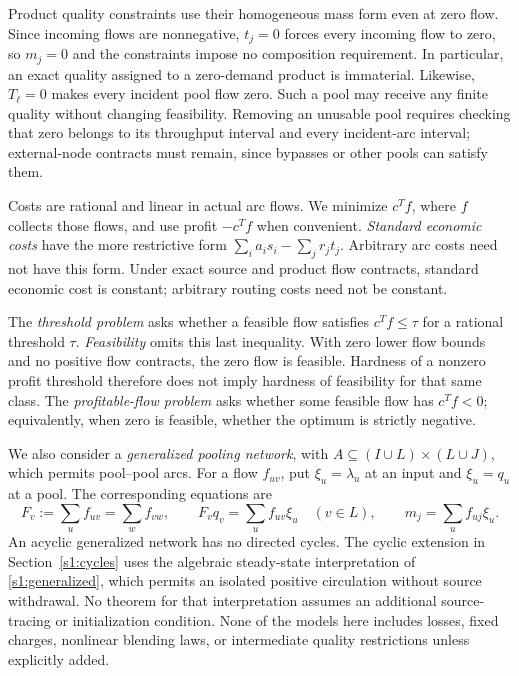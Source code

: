Product quality constraints use their homogeneous mass form even at
zero flow. Since incoming flows are nonnegative, $t_j=0$ forces every
incoming flow to zero, so $m_j=0$ and the constraints impose no composition
requirement. In particular, an exact quality assigned to a zero-demand
product is immaterial. Likewise, $T_\ell=0$ makes every incident pool
flow zero. Such a pool may receive any finite quality without changing
feasibility. Removing an unusable pool requires checking that zero belongs
to its throughput interval and every incident-arc interval; external-node
contracts must remain, since bypasses or other pools can satisfy them.

Costs are rational and linear in actual arc flows. We minimize $c^Tf$,
where $f$ collects those flows, and use profit $-c^Tf$ when convenient.
\emph{Standard economic costs} have the more restrictive form
$\sum_i a_i s_i-\sum_j r_jt_j$. Arbitrary arc costs need not have this
form. Under exact source and product flow contracts, standard economic
cost is constant; arbitrary routing costs need not be constant.

The \emph{threshold problem} asks whether a feasible flow satisfies
$c^Tf\le\tau$ for a rational threshold $\tau$. \emph{Feasibility} omits
this last inequality. With zero lower flow bounds and no positive flow
contracts, the zero flow is feasible. Hardness of a nonzero profit
threshold therefore does not imply hardness of feasibility for that
same class. The \emph{profitable-flow problem} asks whether some feasible
flow has $c^Tf<0$; equivalently, when zero is feasible, whether the optimum
is strictly negative.

We also consider a \emph{generalized pooling network}, with
$A\subseteq(I\cup L)\times(L\cup J)$, which permits pool--pool arcs.
For a flow $f_{uv}$, put $\xi_u=\lambda_u$ at an input and $\xi_u=q_u$
at a pool. The corresponding equations are
\begin{equation}
 F_v:=\sum_u f_{uv}=\sum_w f_{vw},\qquad
 F_vq_v=\sum_u f_{uv}\xi_u \quad(v\in L),\qquad
 m_j=\sum_u f_{uj}\xi_u.\label{s1:generalized}
\end{equation}
An acyclic generalized network has no directed cycles. The cyclic
extension in Section~\ref{s1:cycles} uses the algebraic steady-state
interpretation of \eqref{s1:generalized}, which permits an isolated
positive circulation without source withdrawal. No theorem for that
interpretation assumes an additional source-tracing or initialization
condition. None of the models here includes losses, fixed charges,
nonlinear blending laws, or intermediate quality restrictions unless
explicitly added.

